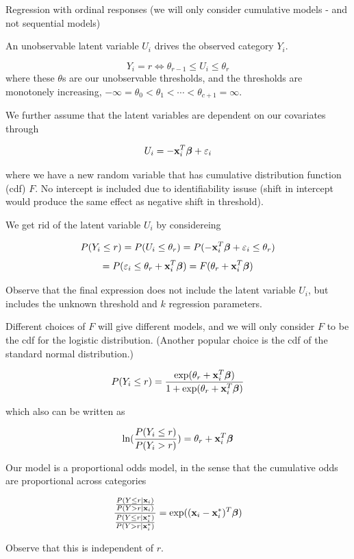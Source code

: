 \documentclass[
  ignorenonframetext,
]{beamer}
\begin{document}
\begin{frame}{Regression with ordinal responses}
\protect\hypertarget{regression-with-ordinal-responses}{}
(we will only consider cumulative models - and not sequential models)

An unobservable latent variable \(U_i\) drives the observed category
\(Y_i\).

\[ Y_i=r \Leftrightarrow \theta_{r-1}\le U_i \le \theta_r\] where these
\(\theta\)s are our unobservable thresholds, and the thresholds are
monotonely increasing,
\(-\infty=\theta_0< \theta_1 < \cdots < \theta_{c+1}=\infty\).

We further assume that the latent variables are dependent on our
covariates through

\[ U_i=-{\bf x}_i^T{\boldsymbol \beta} + \varepsilon_i\]

where we have a new random variable that has cumulative distribution
function (cdf) \(F\). No intercept is included due to identifiability
issuse (shift in intercept would produce the same effect as negative
shift in threshold).
\end{frame}

\begin{frame}
We get rid of the latent variable \(U_i\) by considereing

\[P(Y_i\le r)=P(U_i\le \theta_r)=P(-{\bf x}_i^T {\boldsymbol \beta}+\varepsilon_i \le \theta_r)\]
\[=P(\varepsilon_i \le \theta_r+{\bf x}_i^T {\boldsymbol \beta})=F(\theta_r+{\bf x}_i^T {\boldsymbol \beta}) \]

Observe that the final expression does not include the latent variable
\(U_i\), but includes the unknown threshold and \(k\) regression
parameters.
\end{frame}

\begin{frame}
Different choices of \(F\) will give different models, and we will only
consider \(F\) to be the cdf for the logistic distribution. (Another
popular choice is the cdf of the standard normal distribution.)

\[P(Y_i\le r)=\frac{\exp(\theta_r+{\bf x}_i^T {\boldsymbol \beta})}{1+\exp(\theta_r+{\bf x}_i^T {\boldsymbol \beta})}\]

which also can be written as

\[ \ln(\frac{P(Y_i\le r)}{P(Y_i> r)})=\theta_r+{\bf x}_i^T {\boldsymbol \beta}\]
\end{frame}

\begin{frame}
Our model is a proportional odds model, in the sense that the cumulative
odds are proportional across categories

\[\frac{\frac{P(Y\le r\mid {\bf x}_i)}{P(Y> r\mid {\bf x}_i)}}
{\frac{P(Y\le r\mid {\bf x}^*_i)}{P(Y> r\mid {\bf x}^*_i)}}= \exp(({\bf x}_i-{\bf x}^*_i)^T {\boldsymbol \beta})\]

Observe that this is independent of \(r\).
\end{frame}
\end{document}
